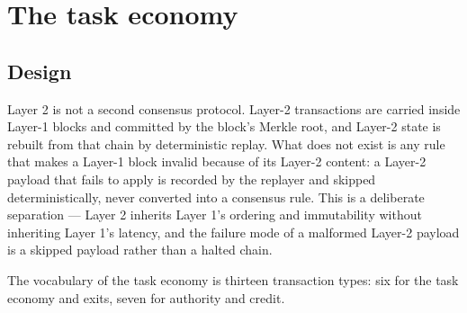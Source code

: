 \documentclass{article}
\begin{document}
\section{The task economy}
\label{sec:l2}

\subsection{Design}

Layer 2 is not a second consensus protocol. Layer-2 transactions are carried
inside Layer-1 blocks and committed by the block's Merkle root, and Layer-2
state is rebuilt from that chain by deterministic replay. What does not exist
is any rule that makes a Layer-1 block invalid because of its Layer-2 content:
a Layer-2 payload that fails to apply is recorded by the replayer and skipped
deterministically, never converted into a consensus rule. This is a
deliberate separation --- Layer 2 inherits Layer 1's ordering and immutability
without inheriting Layer 1's latency, and the failure mode of a malformed
Layer-2 payload is a skipped payload rather than a halted chain.

The vocabulary of the task economy is thirteen transaction types: six for the
task economy and exits, seven for authority and credit.
\end{document}

